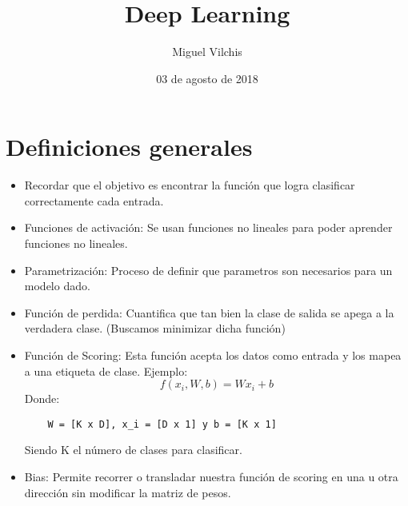 \documentclass{article}
\begin{document}
\title{\vspace{-1cm}Deep Learning}
\author{Miguel Vilchis}
\date{03 de agosto de 2018}
\maketitle
\section{Definiciones generales}
  \begin{itemize}
    \item Recordar que el objetivo es encontrar la función que 
    logra clasificar correctamente cada entrada.
    \item Funciones de activación: Se usan funciones no lineales para
    poder aprender funciones no lineales.
    \item Parametrización: Proceso de definir que parametros son
    necesarios para un modelo dado.
    \item Función de perdida: Cuantifica que tan bien la clase de
    salida se apega a la verdadera clase. (Buscamos minimizar dicha
    función)
    \item Función de Scoring: Esta función acepta los datos como
    entrada y los mapea a una etiqueta de clase. Ejemplo: 
    \[ f(x_i, W, b) = Wx_i+b
    \] 
    Donde: 
    \begin{lstlisting}
    W = [K x D], x_i = [D x 1] y b = [K x 1]
    \end{lstlisting}
    Siendo K el número de clases para clasificar.
    \item Bias: Permite recorrer o transladar nuestra función de
    scoring en una u otra dirección sin modificar la matriz de pesos.
  \end{itemize}
\end{document}
